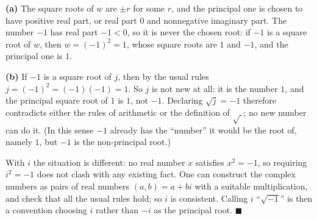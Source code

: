 \textbf{(a)} The square roots of $w$ are $\pm r$ for some $r$, and the principal one is chosen to have positive real part, or real part $0$ and nonnegative imaginary part. The number $-1$ has real part $-1<0$, so it is never the chosen root: if $-1$ is a square root of $w$, then $w=(-1)^2=1$, whose square roots are $1$ and $-1$, and the principal one is $1$.

\textbf{(b)} If $-1$ is a square root of $j$, then by the usual rules $j=(-1)^2=(-1)(-1)=1$. So $j$ is not new at all: it is the number $1$, and the principal square root of $1$ is $1$, not $-1$. Declaring $\sqrt j=-1$ therefore contradicts either the rules of arithmetic or the definition of $\sqrt{\ }$; no new number can do it. (In this sense $-1$ already has the ``number'' it would be the root of, namely $1$, but $-1$ is the non-principal root.)

With $i$ the situation is different: no real number $x$ satisfies $x^2=-1$, so requiring $i^2=-1$ does not clash with any existing fact. One can construct the complex numbers as pairs of real numbers $(a,b)=a+bi$ with a suitable multiplication, and check that all the usual rules hold; so $i$ is consistent. Calling $i$ ``$\sqrt{-1}$'' is then a convention choosing $i$ rather than $-i$ as the principal root. $\blacksquare$
